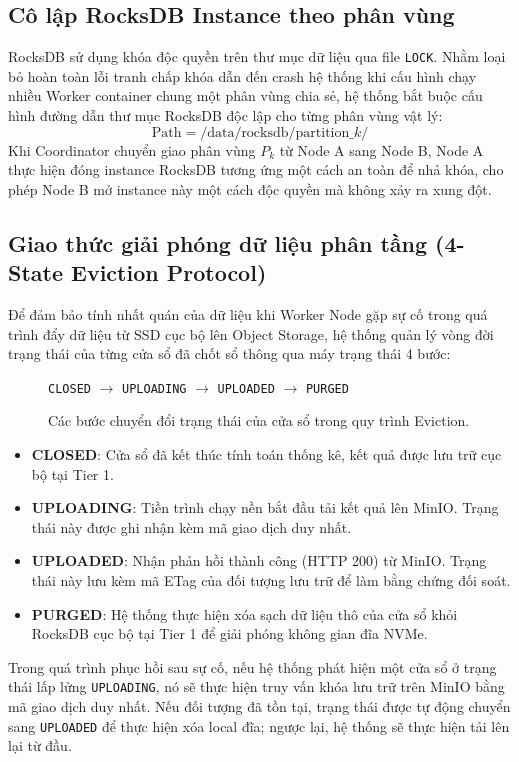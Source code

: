 \documentclass[12pt,a4paper]{article}
\begin{document}
\subsection{Cô lập RocksDB Instance theo phân vùng}
RocksDB sử dụng khóa độc quyền trên thư mục dữ liệu qua file \texttt{LOCK}. Nhằm loại bỏ hoàn toàn lỗi tranh chấp khóa dẫn đến crash hệ thống khi cấu hình chạy nhiều Worker container chung một phân vùng chia sẻ, hệ thống bắt buộc cấu hình đường dẫn thư mục RocksDB độc lập cho từng phân vùng vật lý:
$$\text{Path} = \text{/data/rocksdb/partition\_}k\text{/}$$
Khi Coordinator chuyển giao phân vùng $P_k$ từ Node A sang Node B, Node A thực hiện đóng instance RocksDB tương ứng một cách an toàn để nhả khóa, cho phép Node B mở instance này một cách độc quyền mà không xảy ra xung đột.

\subsection{Giao thức giải phóng dữ liệu phân tầng (4-State Eviction Protocol)}
Để đảm bảo tính nhất quán của dữ liệu khi Worker Node gặp sự cố trong quá trình đẩy dữ liệu từ SSD cục bộ lên Object Storage, hệ thống quản lý vòng đời trạng thái của từng cửa sổ đã chốt sổ thông qua máy trạng thái 4 bước:

\begin{figure}[h]
\centering
\texttt{CLOSED} $\rightarrow$ \texttt{UPLOADING} $\rightarrow$ \texttt{UPLOADED} $\rightarrow$ \texttt{PURGED}
\caption{Các bước chuyển đổi trạng thái của cửa sổ trong quy trình Eviction.}
\end{figure}

\begin{itemize}
    \item \textbf{CLOSED}: Cửa sổ đã kết thúc tính toán thống kê, kết quả được lưu trữ cục bộ tại Tier 1.
    \item \textbf{UPLOADING}: Tiền trình chạy nền bắt đầu tải kết quả lên MinIO. Trạng thái này được ghi nhận kèm mã giao dịch duy nhất.
    \item \textbf{UPLOADED}: Nhận phản hồi thành công (HTTP 200) từ MinIO. Trạng thái này lưu kèm mã ETag của đối tượng lưu trữ để làm bằng chứng đối soát.
    \item \textbf{PURGED}: Hệ thống thực hiện xóa sạch dữ liệu thô của cửa sổ khỏi RocksDB cục bộ tại Tier 1 để giải phóng không gian đĩa NVMe.
\end{itemize}
Trong quá trình phục hồi sau sự cố, nếu hệ thống phát hiện một cửa sổ ở trạng thái lấp lửng \texttt{UPLOADING}, nó sẽ thực hiện truy vấn khóa lưu trữ trên MinIO bằng mã giao dịch duy nhất. Nếu đối tượng đã tồn tại, trạng thái được tự động chuyển sang \texttt{UPLOADED} để thực hiện xóa local đĩa; ngược lại, hệ thống sẽ thực hiện tải lên lại từ đầu.
\end{document}
